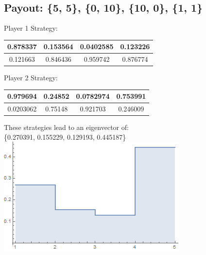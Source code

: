 \documentclass{Article}
\begin{document}
\subsection{Payout: \{5, 5\}, \{0, 10\}, \{10, 0\}, \{1, 1\}}
\begin{center}
Player 1 Strategy: 
  \begin{tabular}{c | c | c | c }
    0.878337 & 0.153564 & 0.0402585 & 0.123226 \\ \hline
    0.121663 & 0.846436 & 0.959742 & 0.876774 \\ \hline
  \end{tabular}
\end{center}
\begin{center}
Player 2 Strategy: 
  \begin{tabular}{c | c | c | c }
    0.979694 & 0.24852 & 0.0782974 & 0.753991 \\ \hline
    0.0203062 & 0.75148 & 0.921703 & 0.246009 \\ \hline
  \end{tabular}
\end{center}
\begin{center}
These strategies lead to an eigenvector of:\\
\{0.270391, 0.155229, 0.129193, 0.445187\}\\
\includegraphics[scale=0.5]{fivefive.png}
\end{center}
\end{document}
